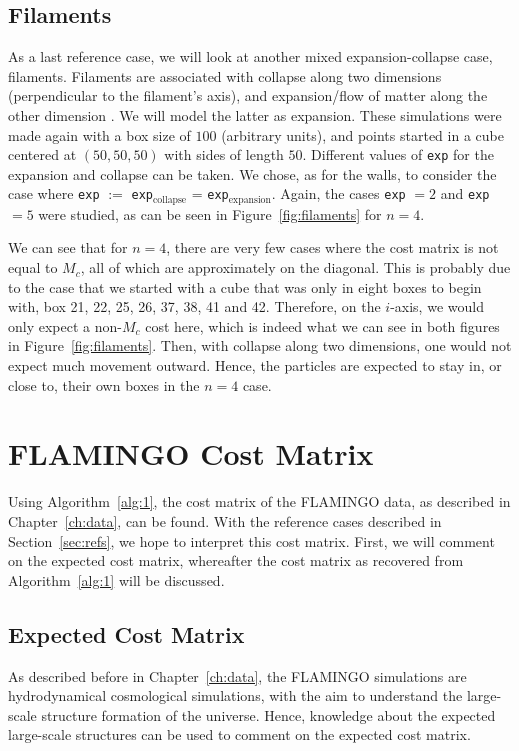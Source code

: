 \subsection{Filaments}
As a last reference case, we will look at another mixed expansion-collapse case, filaments. Filaments are associated with collapse along two dimensions (perpendicular to the filament's axis), and expansion/flow of matter along the other dimension \citep{bos2016}. We will model the latter as expansion. These simulations were made again with a box size of $100$ (arbitrary units), and points started in a cube centered at $(50, 50, 50)$ with sides of length $50$. Different values of \lstinline|exp| for the expansion and collapse can be taken. We chose, as for the walls, to consider the case where \lstinline|exp| $:=$ \lstinline|exp|$_\text{collapse}$ = \lstinline|exp|$_\text{expansion}$. Again, the cases \lstinline|exp| $=2$ and \lstinline|exp| $=5$ were studied, as can be seen in Figure~\ref{fig:filaments} for $n=4$. \par  
We can see that for $n=4$, there are very few cases where the cost matrix is not equal to $M_c$, all of which are approximately on the diagonal. This is probably due to the case that we started with a cube that was only in eight boxes to begin with, box 21, 22, 25, 26, 37, 38, 41 and 42. Therefore, on the $i$-axis, we would only expect a non-$M_c$ cost here, which is indeed what we can see in both figures in Figure~\ref{fig:filaments}. Then, with collapse along two dimensions, one would not expect much movement outward. Hence, the particles are expected to stay in, or close to, their own boxes in the $n=4$ case. 

\section{FLAMINGO Cost Matrix}
Using Algorithm~\ref{alg:1}, the cost matrix of the FLAMINGO data, as described in Chapter~\ref{ch:data}, can be found. With the reference cases described in Section~\ref{sec:refs}, we hope to interpret this cost matrix. First, we will comment on the expected cost matrix, whereafter the cost matrix as recovered from Algorithm~\ref{alg:1} will be discussed. 

\subsection{Expected Cost Matrix}
As described before in Chapter~\ref{ch:data}, the FLAMINGO simulations are hydrodynamical cosmological simulations, with the aim to understand the large-scale structure formation of the universe. Hence, knowledge about the expected large-scale structures can be used to comment on the expected cost matrix.


